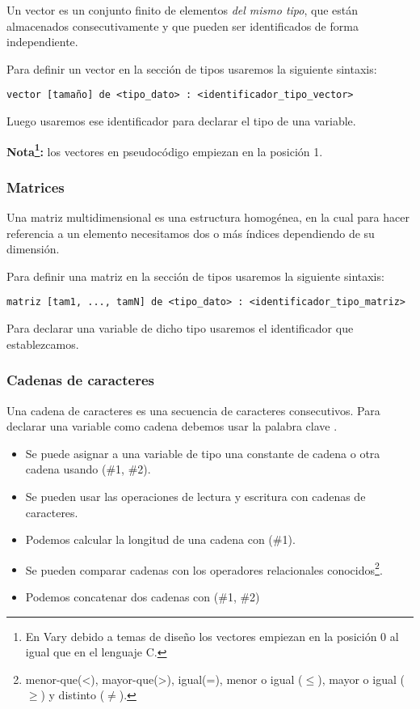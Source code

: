\documentclass{article}
\begin{document}
Un vector es un conjunto finito de elementos \textit{del mismo tipo}, que están almacenados consecutivamente y que pueden ser identificados de forma independiente.

Para definir un vector en la sección de tipos usaremos la siguiente sintaxis:

\begin{lstlisting}[language = pseudocodigoesp]
vector [tamaño] de <tipo_dato> : <identificador_tipo_vector>  
\end{lstlisting}

Luego usaremos ese identificador para declarar el tipo de una variable.

\textbf{Nota\footnote{En Vary debido a temas de diseño los vectores empiezan en la posición 0 al igual que en el lenguaje C.}:} los vectores en pseudocódigo empiezan en la posición 1.

\subsubsection{Matrices}

Una matriz multidimensional es una estructura homogénea, en la cual para hacer referencia a un elemento necesitamos dos o más índices dependiendo de su dimensión.

Para definir una matriz en la sección de tipos usaremos la siguiente sintaxis:

\begin{lstlisting}[language = pseudocodigoesp]
matriz [tam1, ..., tamN] de <tipo_dato> : <identificador_tipo_matriz>
\end{lstlisting}

Para declarar una variable de dicho tipo usaremos el identificador que establezcamos.

\subsubsection{Cadenas de caracteres}

Una cadena de caracteres es una secuencia de caracteres consecutivos. Para declarar una variable como cadena debemos usar la palabra clave .

\begin{itemize}
\item Se puede asignar a una variable de tipo  una constante de cadena o otra cadena usando (\#1, \#2).
\item Se pueden usar las operaciones de lectura y escritura con cadenas de caracteres.
\item Podemos calcular la longitud de una cadena con (\#1).
\item Se pueden comparar cadenas con los operadores relacionales conocidos\footnote{menor-que(<), mayor-que(>), igual(=), menor o igual ($\leq$), mayor o igual ($\geq$) y distinto ($\neq$).}.
\item Podemos concatenar dos cadenas con (\#1, \#2)
\end{itemize}
\end{document}
